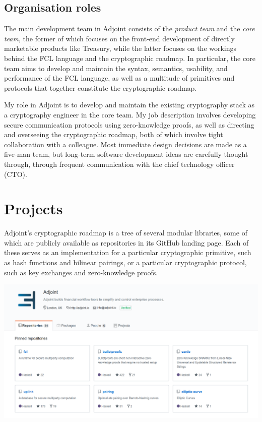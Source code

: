 \documentclass[11pt]{article}
\begin{document}
\subsection{Organisation roles}

The main development team in Adjoint consists of the \emph{product team} and the \emph{core team}, the former of which focuses on the front-end development of directly marketable products like Treasury, while the latter focuses on the workings behind the FCL language and the cryptographic roadmap. In particular, the core team aims to develop and maintain the syntax, semantics, usability, and performance of the FCL language, as well as a multitude of primitives and protocols that together constitute the cryptographic roadmap.

My role in Adjoint is to develop and maintain the existing cryptography stack as a cryptography engineer in the core team. My job description involves developing secure communication protocols using zero-knowledge proofs, as well as directing and overseeing the cryptographic roadmap, both of which involve tight collaboration with a colleague. Most immediate design decisions are made as a five-man team, but long-term software development ideas are carefully thought through, through frequent communication with the chief technology officer (CTO).

\pagebreak

\section{Projects}

Adjoint's cryptographic roadmap is a tree of several modular libraries, some of which are publicly available as repositories in its GitHub landing page. Each of these serves as an implementation for a particular cryptographic primitive, such as hash functions and bilinear pairings, or a particular cryptographic protocol, such as key exchanges and zero-knowledge proofs.

\begin{center}
\includegraphics[width=\textwidth]{github.png}
\end{center}
\end{document}
